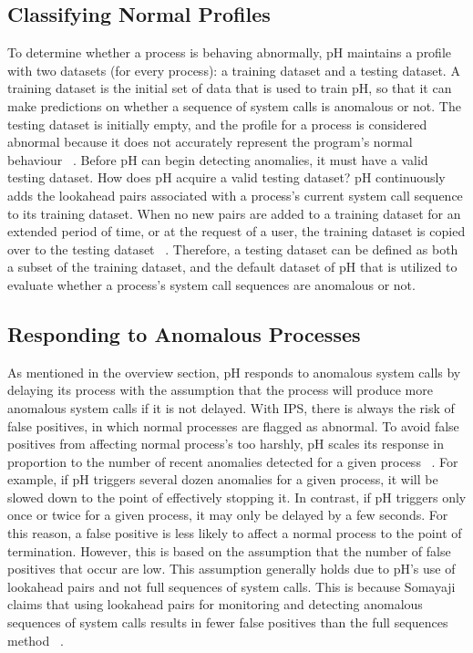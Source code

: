 \documentclass{report}
\begin{document}
\begin{spacing}{1.5}
\subsection{Classifying Normal Profiles}

{\large
To determine whether a process is behaving abnormally, pH maintains a profile with two datasets (for every process): a training dataset and a testing dataset. A training dataset is the initial set of data that is used to train pH, so that it can make predictions on whether a sequence of system calls is anomalous or not. The testing dataset is initially empty, and the profile for a process is considered abnormal because it does not accurately represent the program's normal behaviour ~\cite{somayaji2002operating}. Before pH can begin detecting anomalies, it must have a valid testing dataset. How does pH acquire a valid testing dataset? pH continuously adds the lookahead pairs associated with a process's current system call sequence to its training dataset. When no new pairs are added to a training dataset for an extended period of time, or at the request of a user, the training dataset is copied over to the testing dataset ~\cite{somayaji2002operating}. Therefore, a testing dataset can be defined as both a subset of the training dataset, and the default dataset of pH that is utilized to evaluate whether a process's system call sequences are anomalous or not.
\leavevmode\newline
}



\subsection{Responding to Anomalous Processes}


{\large
As mentioned in the overview section, pH responds to anomalous system calls by delaying its process with the assumption that the process will produce more anomalous system calls if it is not delayed. With IPS, there is always the risk of false positives, in which normal processes are flagged as abnormal. To avoid false positives from affecting normal process's too harshly, pH scales its response in proportion to the number of recent anomalies detected for a given process ~\cite{findlay2021practical}. For example, if pH triggers several dozen anomalies for a given process, it will be slowed down to the point of effectively stopping it. In contrast, if pH triggers only once or twice for a given process, it may only be delayed by a few seconds. For this reason, a false positive is less likely to affect a normal process to the point of termination. However, this is based on the assumption that the number of false positives that occur are low. This assumption generally holds due to pH's use of lookahead pairs and not full sequences of system calls. This is because Somayaji claims that using lookahead pairs for monitoring and detecting anomalous sequences of system calls results in fewer false positives than the full sequences method ~\cite{findlay2021practical}.
\leavevmode\newline
}







\end{spacing}
\end{document}
